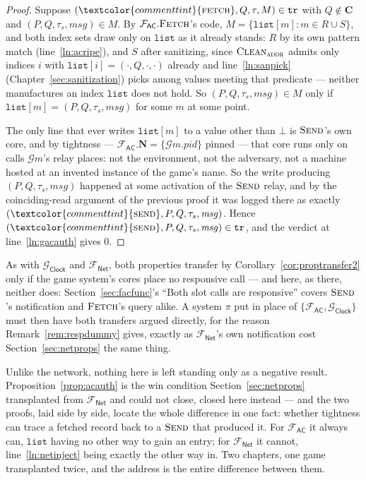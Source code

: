 \documentclass[10pt,oneside,openany]{book}
\newcommand{\PID}{\mathit{pid}}
\newcommand{\admits}{\mathbf{N}}
\newcommand{\Cs}{\mathbf{C}}
\newcommand{\op}[1]{\textnormal{\textsc{#1}}}
\newcommand{\atom}[1]{\textcolor{commenttint}{\op{#1}}}
\newcommand{\Gm}{\mathcal{G}m}
\newcommand{\Gclock}{\mathcal{G}_{\mathsf{Clock}}}
\newcommand{\Fnet}{\mathcal{F}_{\mathsf{Net}}}
\newcommand{\Fac}{\mathcal{F}_{\mathsf{AC}}}
\newcommand{\msg}{\mathit{msg}}
\newcommand{\none}{\bot}
\newcommand{\Clean}{\op{Clean}}
\newcommand{\V}[1]{\mathtt{#1}}
\theoremstyle{accentdef}
\theoremstyle{accentplain}
\begin{document}
\begin{proof}
Suppose $(\atom{fetch},Q,\tau,M) \in \V{tr}$ with $Q \notin \Cs$ and $(P,Q,\tau_s,\msg) \in M$. By
$\Fac.\op{Fetch}$'s code, $M = \{\V{list}[m] : m \in R \cup S\}$, and both index sets draw only on
$\V{list}$ as it already stands: $R$ by its own pattern match (line~\ref{ln:acripe}), and $S$ after
sanitizing, since $\Clean_{\op{addr}}$ admits only indices $i$ with
$\V{list}[i] = (\cdot,Q,\cdot,\cdot)$ already and line~\ref{ln:sanpick}
(Chapter~\ref{sec:sanitization}) picks among values meeting that predicate --- neither
manufactures an index $\V{list}$ does not hold. So $(P,Q,\tau_s,\msg) \in M$ only if
$\V{list}[m] = (P,Q,\tau_s,\msg)$ for some $m$ at some point.

The only line that ever writes $\V{list}[m]$ to a value other than $\none$ is $\op{Send}$'s own
core, and by tightness --- $\Fac.\admits = \{\Gm.\PID\}$ pinned --- that core runs only on calls
$\Gm$'s relay places: not the environment, not the adversary, not a machine hosted at an invented
instance of the game's name. So the write producing $(P,Q,\tau_s,\msg)$ happened at some
activation of the $\op{Send}$ relay, and by the coinciding-read argument of the previous proof it
was logged there as exactly $(\atom{send},P,Q,\tau_s,\msg)$. Hence
$(\atom{send},P,Q,\tau_s,\msg) \in \V{tr}$, and the verdict at line~\ref{ln:gacauth} gives $0$.
\end{proof}

As with $\Gclock$ and $\Fnet$, both properties transfer by Corollary~\ref{cor:proptransfer2} only
if the game system's cores place no responsive call --- and here, as there, neither does:
Section~\ref{sec:facfunc}'s ``Both slot calls are responsive'' covers $\op{Send}$'s notification
and $\op{Fetch}$'s query alike. A system $\pi$ put in place of $\{\Fac,\Gclock\}$ must then have
both transfers argued directly, for the reason Remark~\ref{rem:respdummy} gives, exactly as
$\Fnet$'s own notification cost Section~\ref{sec:netprops} the same thing.

Unlike the network, nothing here is left standing only as a negative result.
Proposition~\ref{prop:acauth} is the win condition Section~\ref{sec:netprops} transplanted from
$\Fnet$ and could not close, closed here instead --- and the two proofs, laid side by side, locate
the whole difference in one fact: whether tightness can trace a fetched record back to a
$\op{Send}$ that produced it. For $\Fac$ it always can, $\V{list}$ having no other way to gain an
entry; for $\Fnet$ it cannot, line~\ref{ln:netinject} being exactly the other way in. Two
chapters, one game transplanted twice, and the address is the entire difference between them.
\end{document}

